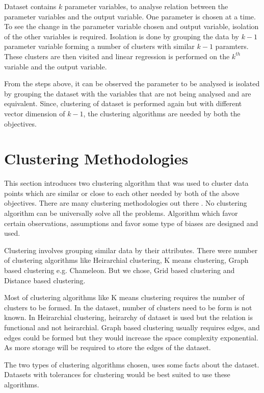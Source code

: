 Dataset contains \(k\) parameter variables, to analyse relation between the parameter variables and the output variable. One parameter is chosen at a time. To see the change in the parameter variable chosen and output variable, isolation of the other variables is required. Isolation is done by grouping the data by \(k-1\) parameter variable forming a number of clusters with similar \(k-1\) paramters. These clusters are then visited and linear regression is performed on the \(k^{th}\) variable and the output variable. 

From the steps above, it can be observed the parameter to be analysed is isolated by grouping the dataset with the variables that are not being analysed and are equivalent. Since, clustering of dataset is performed again but with different vector dimension of \(k-1\), the clustering algorithms are needed by both the objectives.

\section{Clustering Methodologies}

This section introduces two clustering algorithm that was used to cluster data points which are similar or close to each other needed by both of the above objectives. There are many clustering methodologies out there \cite{xu2005survey}. No clustering algorithm can be universally solve all the problems. Algorithm which favor certain observations, assumptions and favor some type of biases are designed and used. 

Clustering involves grouping similar data by their attributes. There were number of clustering algorithms like Heirarchial clustering, K means clustering, Graph based clustering e.g. Chameleon. But we chose, Grid based clustering and Distance based clustering.

Most of clustering algorithms like K means clustering requires the number of clusters to be formed. In the dataset, number of clusters need to be form is not known. In Heirarchial clustering, heirarchy of dataset is used but the relation is functional and not heirarchial. Graph based clustering usually requires edges, and edges could be formed but they would increase the space complexity exponential. As more storage will be required to store the edges of the dataset.

The two types of clustering algorithms chosen, uses some facts about the dataset. Datasets with tolerances for clustering would be best suited to use these algorithms.

